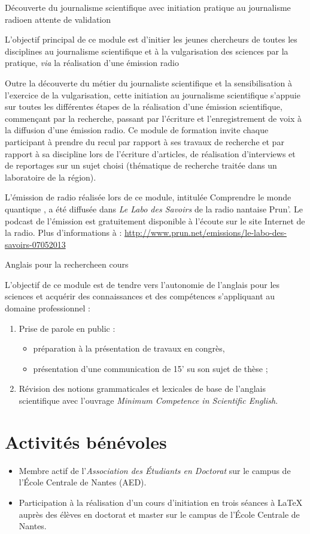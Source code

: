 \formation
{Découverte du journalisme scientifique avec initiation pratique au journalisme radio}{en attente de validation}
{L'objectif principal de ce module est d'initier les jeunes chercheurs de toutes les disciplines au journalisme scientifique et à la vulgarisation des sciences par la pratique, \textit{via} la réalisation d'une émission radio

Outre la découverte du métier du journaliste scientifique et la sensibilisation à l'exercice de la vulgarisation, cette initiation au journalisme scientifique s'appuie sur toutes les différentes étapes de la réalisation d'une émission scientifique, commençant par la recherche, passant par l'écriture et l'enregistrement de voix à la diffusion d'une émission radio. Ce module de formation invite chaque participant à prendre du recul par rapport à ses travaux de recherche et par rapport à sa discipline lors de l'écriture d'articles, de réalisation d'interviews et de reportages sur un sujet choisi (thématique de recherche traitée dans un laboratoire de la région).

L'émission de radio réalisée lors de ce module, intitulée \og Comprendre le monde quantique \fg, a été diffusée dans \textit{Le Labo des Savoirs} de la radio nantaise Prun'.
Le podcast de l'émission est gratuitement disponible à l'écoute sur le site Internet de la radio.
Plus d'informations à : \url{http://www.prun.net/emissions/le-labo-des-savoirs-07052013}}

\formation
{Anglais pour la recherche}{en cours}
{L'objectif de ce module est de tendre vers l'autonomie de l'anglais pour les sciences et acquérir des connaissances et des compétences s'appliquant au domaine professionnel :
\begin{enumerate}
  \item Prise de parole en public :
  \begin{itemize}
    \item préparation à la présentation de travaux en congrès,
    \item présentation d'une communication de 15' su son sujet de thèse ;
  \end{itemize}
  \item Révision des notions grammaticales et lexicales de base de l'anglais scientifique avec l'ouvrage \textit{Minimum Competence in Scientific English}.
\end{enumerate}}



\section{Activités bénévoles}
\begin{itemize}
\renewcommand{\labelitemi}{\qquad$\circ$}
  \item Membre actif de l'\emph{Association des Étudiants en Doctorat} sur le campus de l'École Centrale de Nantes (AED).
  \item Participation à la réalisation d'un cours d'initiation en trois séances à \LaTeX{} auprès des élèves en doctorat et master sur le campus de l'École Centrale de Nantes.
\end{itemize}
